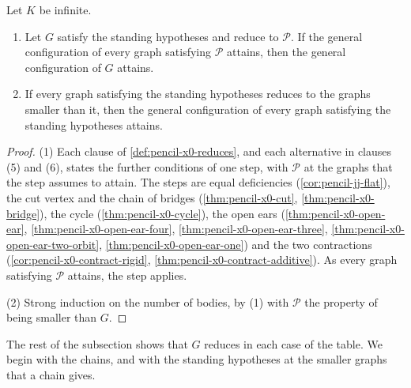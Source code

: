 \begin{theorem}
  \label{thm:pencil-x0-reduction-attains}
  \leanok
  Let $K$ be infinite.
  \begin{enumerate}
    \item Let $G$ satisfy the standing hypotheses and reduce to
      $\mathcal P$. If the general configuration of every graph
      satisfying $\mathcal P$ attains, then the general configuration of
      $G$ attains.
    \item If every graph satisfying the standing hypotheses reduces to
      the graphs smaller than it, then the general configuration of
      every graph satisfying the standing hypotheses attains.
  \end{enumerate}
\end{theorem}
\begin{proof}
  \leanok
  (1) Each clause of \cref{def:pencil-x0-reduces}, and each alternative
  in clauses (5) and (6), states the further conditions of one step, with
  $\mathcal P$ at the graphs that the step assumes to attain. The steps
  are equal deficiencies (\cref{cor:pencil-jj-flat}), the cut vertex
  and the chain of bridges (\cref{thm:pencil-x0-cut},
  \cref{thm:pencil-x0-bridge}), the cycle (\cref{thm:pencil-x0-cycle}),
  the open ears (\cref{thm:pencil-x0-open-ear},
  \cref{thm:pencil-x0-open-ear-four},
  \cref{thm:pencil-x0-open-ear-three},
  \cref{thm:pencil-x0-open-ear-two-orbit},
  \cref{thm:pencil-x0-open-ear-one}) and the two contractions
  (\cref{cor:pencil-x0-contract-rigid},
  \cref{thm:pencil-x0-contract-additive}). As every graph satisfying
  $\mathcal P$ attains, the step applies.

  (2) Strong induction on the number of bodies, by (1) with $\mathcal P$
  the property of being smaller than $G$.
\end{proof}

The rest of the subsection shows that $G$ reduces in each case of the
table. We begin with the chains, and with the standing hypotheses at the
smaller graphs that a chain gives.

